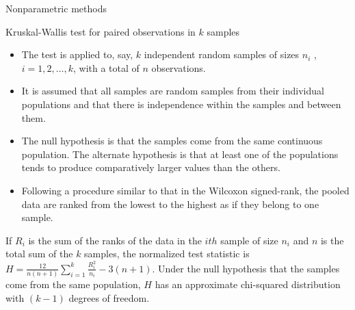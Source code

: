 \documentclass[8pt]{beamer}
\renewcommand{\emph}[1]{\textcolor{myorange}{#1}}
\begin{document}
\begin{frame}{Nonparametric methods}
    \begin{block}{Kruskal-Wallis test for paired observations in $k$ samples}
    \end{block}
    \begin{itemize}
        \item The test is applied to, say, $k$ independent \emph{random samples} of sizes $n_i$ , $i = 1, 2, \dots , k$, with a total of $n$ observations.
        \item It is assumed that all samples are \emph{random samples} from their individual populations and that there is independence within the samples and between them.
        \item The null hypothesis is that the samples come from the same continuous population. The alternate hypothesis is that at least one of the populations tends to produce comparatively larger values than the others.
        \item Following a procedure similar to that in the \emph{Wilcoxon signed-rank}, the pooled data are ranked from the lowest to the highest as if they belong to one sample.

    \end{itemize}
    If $R_i$ is the sum of the ranks of the data in the $ith$ sample of size $n_i$ and $n$ is the total sum of the $k$ samples, the normalized test statistic is $H = \frac{12}{n(n+1)} \sum_{i=1}^k \frac{R_i^2}{n_i} - 3(n+1)$. Under the \emph{null hypothesis} that the samples come from the same population, $H$ has an approximate \emph{chi-squared distribution} with $(k - 1)$  \emph{degrees of freedom}.
   \end{frame}
\end{document}

